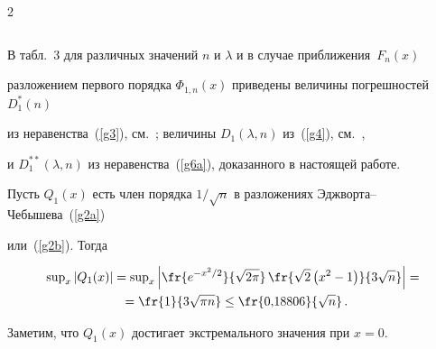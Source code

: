 \begin{multicols}{2}
\begin{center}
{\begin{tabular}{|c|c||c|c||c|c|}
\hline 


\end{tabular}


}


\end{center}







\smallskip


\addtocounter{table}{1}








В табл.~3 для различных значений $n$ и $\lambda$ и в случае приближения~$F_n(x)$  


разложением первого порядка $\Phi_{1,n}(x)$ приведены  величины погрешностей   $D^*_1(n)$ 


из неравенства~(\ref{g3}), см.~\cite{6-cr}; величины   $D_1(\lambda,n)$ из~(\ref{g4}), см.~\cite{1-cr}, 


и $D_1^{**}(\lambda,n)$ из неравенства~(\ref{g6a}), доказанного в настоящей работе.











Пусть $Q_1(x)$ есть член порядка   $1/\sqrt{n}$ в разложениях Эджворта--Чебышева~(\ref{g2a})  


или~(\ref{g2b}). Тогда





\noindent


\begin{multline*} 


\sup\nolimits_x|Q_1(x)|=\sup\nolimits_x \left|\fr{e^{-x^2/2}}{\sqrt{2\pi}}\,


  \fr{\sqrt{2}\left(x^2-1\right)}{3 \sqrt{n}}\right|={}\\


  {}= \fr{1}{3\sqrt{\pi n}}\leq \fr{0{,}18806}{\sqrt{n}}\,.


  \end{multline*}


Заметим, что $Q_1(x)$ достигает экстремального значения при   $x=0$.





\medskip






\end{multicols}

